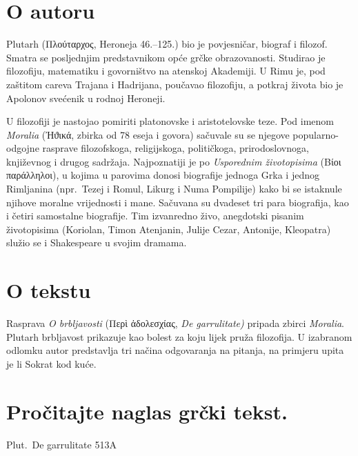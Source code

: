 \section*{O autoru}

Plutarh (Πλούταρχος, Heroneja 46.–125.) bio je povjesničar, biograf i filozof. Smatra se posljednjim predstavnikom opće grčke obrazovanosti. Studirao je filozofiju, matematiku i govorništvo na atenskoj Akademiji. U Rimu je, pod zaštitom careva Trajana i Hadrijana, poučavao filozofiju, a potkraj života bio je Apolonov svećenik u rodnoj Heroneji. 

U filozofiji je nastojao pomiriti platonovske i aristotelovske teze. Pod imenom \textit{Moralia} (Ἠϑικά, zbirka od 78 eseja i govora) sačuvale su se njegove popularno-odgojne rasprave filozofskoga, religijskoga, političkoga, prirodoslovnoga, književnog i drugog sadržaja. Najpoznatiji je po \textit{Usporednim životopisima} \textgreek[variant=ancient]{(Βίοι παράλληλοι),} u kojima u parovima donosi biografije jednoga Grka i jednog Rimljanina (npr.\ Tezej i Romul, Likurg i Numa Pompilije) kako bi se istaknule njihove moralne vrijednosti i mane. Sačuvana su dvadeset tri para biografija, kao i četiri samostalne biografije. Tim izvanredno živo, anegdotski pisanim životopisima (Koriolan, Timon Atenjanin, Julije Cezar, Antonije, Kleopatra) služio se i Shakespeare u svojim dramama.

\section*{O tekstu}

Rasprava \textit{O brbljavosti} \textgreek[variant=ancient]{(Περὶ ἀδολεσχίας,} \textit{De garrulitate)} pripada zbirci \textit{Moralia}. Plutarh brbljavost prikazuje kao bolest za koju lijek pruža filozofija. U izabranom odlomku autor predstavlja tri načina odgovaranja na pitanja, na primjeru upita je li Sokrat kod kuće.

\newpage

\section*{Pročitajte naglas grčki tekst.}


Plut.\ De garrulitate 513A

\medskip

